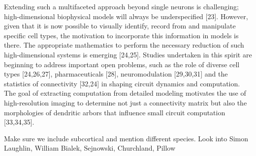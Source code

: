 Extending such a multifaceted approach beyond single neurons is challenging; high-dimensional biophysical models will always be underspecified [23]. However, given that it is now possible to visually identify, record from and manipulate specific cell types, the motivation to incorporate this information in models is there. The appropriate mathematics to perform the necessary reduction of such high-dimensional systems is emerging [24,25]. Studies undertaken in this spirit are beginning to address important open problems, such as the role of diverse cell types [24,26,27], pharmaceuticals [28], neuromodulation [29,30,31] and the statistics of connectivity [32,24] in shaping circuit dynamics and computation. The goal of extracting computation from detailed modeling motivates the use of high-resolution imaging to determine not just a connectivity matrix but also the morphologies of dendritic arbors that influence small circuit computation [33,34,35].




Make sure we include subcortical and mention different species.
Look into Simon Laughlin, William Bialek, Sejnowski, Churchland, Pillow
